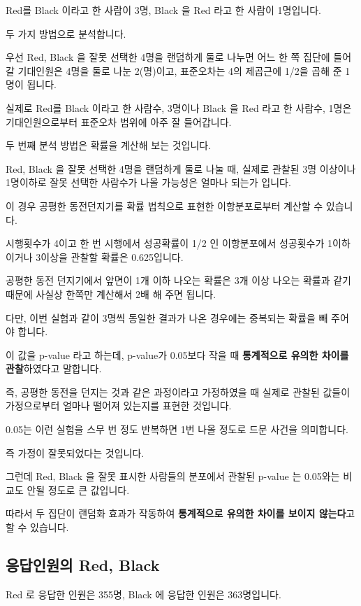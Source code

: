 \documentclass[
]{book}
\begin{document}
Red를 Black 이라고 한 사람이 3명, Black 을 Red 라고 한 사람이 1명입니다.

두 가지 방법으로 분석합니다.

우선 Red, Black 을 잘못 선택한 4명을 랜덤하게 둘로 나누면 어느 한 쪽 집단에 들어갈 기대인원은 4명을 둘로 나눈 2(명)이고, 표준오차는 4의 제곱근에 1/2을 곱해 준 1명이 됩니다.

실제로 Red를 Black 이라고 한 사람수, 3명이나 Black 을 Red 라고 한 사람수, 1명은 기대인원으로부터 표준오차 범위에 아주 잘 들어갑니다.

두 번째 분석 방법은 확률을 계산해 보는 것입니다.

Red, Black 을 잘못 선택한 4명을 랜덤하게 둘로 나눌 때, 실제로 관찰된 3명 이상이나 1명이하로 잘못 선택한 사람수가 나올 가능성은 얼마나 되는가 입니다.

이 경우 공평한 동전던지기를 확률 법칙으로 표현한 이항분포로부터 계산할 수 있습니다.

시행횟수가 4이고 한 번 시행에서 성공확률이 1/2 인 이항분포에서 성공횟수가 1이하이거나 3이상을 관찰할 확률은 0.625입니다.

공평한 동전 던지기에서 앞면이 1개 이하 나오는 확률은 3개 이상 나오는 확률과 같기 때문에 사실상 한쪽만 계산해서 2배 해 주면 됩니다.

다만, 이번 실험과 같이 3명씩 동일한 결과가 나온 경우에는 중복되는 확률을 빼 주어야 합니다.

이 값을 p-value 라고 하는데, p-value가 0.05보다 작을 때 \textbf{통계적으로 유의한 차이를 관찰}하였다고 말합니다.

즉, 공평한 동전을 던지는 것과 같은 과정이라고 가정하였을 때 실제로 관찰된 값들이 가정으로부터 얼마나 떨어져 있는지를 표현한 것입니다.

0.05는 이런 실험을 스무 번 정도 반복하면 1번 나올 정도로 드문 사건을 의미합니다.

즉 가정이 잘못되었다는 것입니다.

그런데 Red, Black 을 잘못 표시한 사람들의 분포에서 관찰된 p-value 는 0.05와는 비교도 안될 정도로 큰 값입니다.

따라서 두 집단이 랜덤화 효과가 작동하여 \textbf{통계적으로 유의한 차이를 보이지 않는다}고 할 수 있습니다.

\subsection{응답인원의 Red, Black}\label{uxc751uxb2f5uxc778uxc6d0uxc758-red-black-19}

Red 로 응답한 인원은 355명, Black 에 응답한 인원은 363명입니다.
\end{document}

